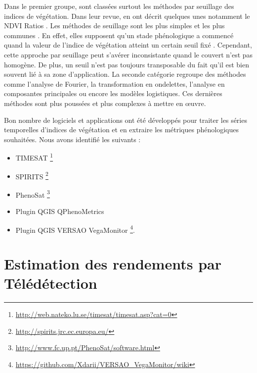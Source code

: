 Dans le premier groupe, sont classées surtout les méthodes par seuillage des indices de végétation. Dans leur revue, \citet{deBeurs2010} en ont décrit quelques unes notamment le NDVI 
Ratios \citep{White1997}. Les méthodes de seuillage sont les plus simples et les plus communes \citep{Pan2015}. En effet, elles supposent qu’un stade phénologique a commencé quand 
la valeur de l'indice de végétation atteint un certain seuil fixé \citep{Jonsson2002}. Cependant, cette approche par seuillage peut s'avérer inconsistante quand le couvert n'est 
pas homogène. De plus, un seuil n'est pas toujours transposable du fait qu'il est bien souvent lié à sa zone d'application. La seconde catégorie regroupe  des méthodes comme
l'analyse de Fourier, la transformation en ondelettes, l'analyse en composantes principales ou encore les modèles logistiques. Ces dernières méthodes sont plus poussées et plus 
complexes à mettre en \oe uvre. 

\vspace{5mm}

Bon nombre de logiciels et applications ont été développés pour traiter les séries temporelles d'indices de végétation et en extraire les métriques phénologiques souhaitées. 
Nous avons identifié les suivants :
\begin{itemize}
 \item TIMESAT \footnote{\url{http://web.nateko.lu.se/timesat/timesat.asp?cat=0}} \citep{Eklundh2017} 
 \item SPIRITS \footnote{\url{http://spirits.jrc.ec.europa.eu/}}
 \item PhenoSat \footnote{\url{http://www.fc.up.pt/PhenoSat/software.html}} \citep{Rodrigues2013}
 \item Plugin QGIS QPhenoMetrics \citep{Duarte2018}
 \item Plugin QGIS VERSAO VegaMonitor \footnote{\url{https://github.com/Xdarii/VERSAO_VegaMonitor/wiki}}.
\end{itemize}

\section{Estimation des rendements par Télédétection}